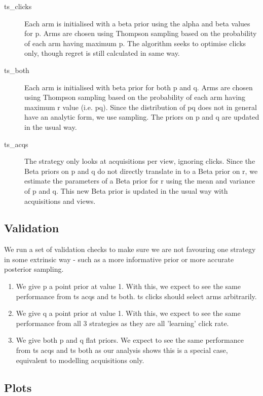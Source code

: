 \documentclass[11pt,a4,singlespacing,titlepagenumber=on]{scrreprt}
\numberwithin{equation}{chapter} %
\theoremstyle{remark}
\begin{document}
\begin{description}
	\item[ts\_clicks] Each arm is initialised with a beta prior using the alpha and beta values for p. Arms are chosen using Thompson sampling based on the probability of each arm having maximum p. The algorithm seeks to optimise clicks only, though regret is still calculated in same way.
	\item[ts\_both] Each arm is initialised with beta prior for both p and q. Arms are chosen using Thompson sampling based on the probability of each arm having maximum r value (i.e. pq). Since the distribution of pq does not in general have an analytic form, we use sampling. The priors on p and q are updated in the usual way.
	\item[ts\_acqs] The strategy only looks at acquisitions per view, ignoring clicks. Since the Beta priors on p and q do not directly translate in to a Beta prior on r, we estimate the parameters of a Beta prior for r using the mean and variance of p and q. This new Beta prior is updated in the usual way with acquisitions and views.
\end{description}

\subsection{Validation}

We run a set of validation checks to make sure we are not favouring one strategy in some extrinsic way - such as a more informative prior or more accurate posterior sampling.

\begin{enumerate}
	\item  We give p a point prior at value 1. With this, we expect to see the same performance from ts acqs and ts both. ts clicks should select arms arbitrarily.
	\item  We give q a point prior at value 1. With this, we expect to see the same performance from all 3 strategies as they are all 'learning' click rate.
	\item  We give both p and q flat priors. We expect to see the same performance from ts acqs and ts both as our analysis shows this is a special case, equivalent to modelling acquisitions only.
\end{enumerate}

\subsection{Plots}
\end{document}
